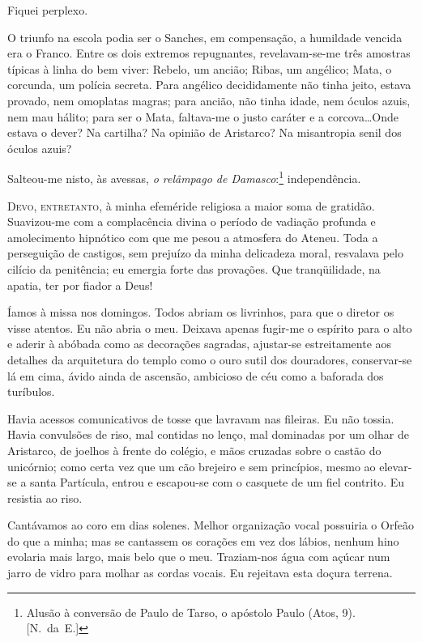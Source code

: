 Fiquei perplexo. 

O triunfo na escola podia ser o Sanches, em
compensação, a humildade vencida era o Franco. Entre os dois extremos
repugnantes, revelavam{}-se{}-me três amostras típicas à linha do bem
viver: Rebelo, um ancião; Ribas, um angélico; Mata, o corcunda, um
polícia secreta. Para angélico decididamente não tinha jeito, estava
provado, nem omoplatas magras; para ancião, não tinha idade, nem óculos
azuis, nem mau hálito; para ser o Mata, faltava{}-me o justo caráter e
a corcova\ldots Onde estava o dever? Na cartilha? Na opinião de Aristarco?
Na misantropia senil dos óculos azuis? 

Salteou{}-me nisto, às avessas,
\textit{o relâmpago de Damasco}:\footnote{ Alusão à conversão de Paulo de Tarso, 
o apóstolo Paulo (Atos, 9). \mbox{[N.~da E.]}} independência. 

\sectionitem

\noindent\textsc{Devo, entretanto}, à minha efeméride religiosa a maior soma de gratidão.
Suavizou{}-me com a complacência divina o período de vadiação profunda
e amolecimento hipnótico com que me pesou a atmosfera do Ateneu. Toda a
perseguição de castigos, sem prejuízo da minha delicadeza moral,
resvalava pelo cilício da penitência; eu emergia forte das provações.
Que tranqüilidade, na apatia, ter por fiador a Deus! 

Íamos à missa nos domingos. Todos abriam os livrinhos, para que o diretor os visse
atentos. Eu não abria o meu. Deixava apenas fugir{}-me o espírito para
o alto e aderir à abóbada como as decorações sagradas, ajustar{}-se
estreitamente aos detalhes da arquitetura do templo como o ouro sutil
dos douradores, conservar{}-se lá em cima, ávido ainda de ascensão,
ambicioso de céu como a baforada dos turíbulos. 

Havia acessos comunicativos de tosse que lavravam nas fileiras. Eu não tossia. 
Havia convulsões de riso, mal contidas no lenço, mal dominadas por um olhar
de Aristarco, de joelhos à frente do colégio, e mãos cruzadas sobre o
castão do unicórnio; como certa vez que um cão brejeiro e sem
princípios, mesmo ao elevar{}-se a santa Partícula, entrou e
escapou{}-se com o casquete de um fiel contrito. Eu resistia ao riso.

Cantávamos ao coro em dias solenes. Melhor organização vocal possuiria
o Orfeão do que a minha; mas se cantassem os corações em vez dos
lábios, nenhum hino evolaria mais largo, mais belo que o meu.
Traziam{}-nos água com açúcar num jarro de vidro para molhar as cordas
vocais. Eu rejeitava esta doçura terrena. 

